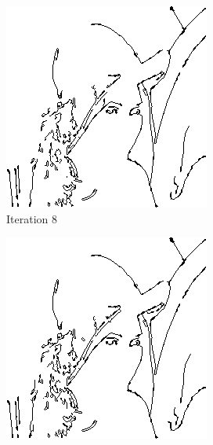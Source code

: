 \documentclass{llncs}
\begin{document}
\begin{figure}
        \begin{subfigure}[b]{0.3\textwidth}
                \includegraphics[width=\textwidth]{IMG/ImprovedSearch/Iteration8}
                \caption{Iteration 8}
                \label{fig:search_iter8}
        \end{subfigure}
        \quad
        \begin{subfigure}[b]{0.3\textwidth}
                \includegraphics[width=\textwidth]{IMG/ImprovedSearch/Iteration9}

\end{subfigure}
\end{figure}
\end{document}
